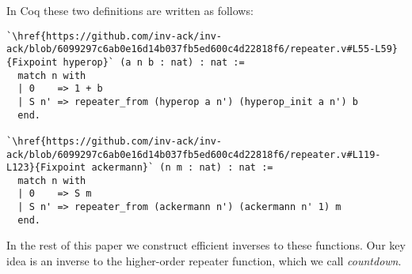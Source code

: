 In Coq these two definitions are written as follows:
\begin{lstlisting}
`\href{https://github.com/inv-ack/inv-ack/blob/6099297c6ab0e16d14b037fb5ed600c4d22818f6/repeater.v#L55-L59}{Fixpoint hyperop}` (a n b : nat) : nat :=
  match n with
  | 0    => 1 + b
  | S n' => repeater_from (hyperop a n') (hyperop_init a n') b
  end.

`\href{https://github.com/inv-ack/inv-ack/blob/6099297c6ab0e16d14b037fb5ed600c4d22818f6/repeater.v#L119-L123}{Fixpoint ackermann}` (n m : nat) : nat :=
  match n with
  | 0    => S m
  | S n' => repeater_from (ackermann n') (ackermann n' 1) m
  end.
\end{lstlisting}
In the rest of this paper we construct efficient inverses to these
functions.  Our key idea is an inverse to the higher-order repeater function, which we call \emph{countdown}.









